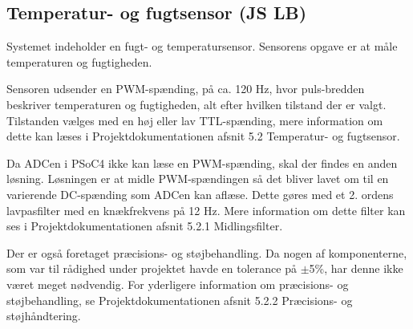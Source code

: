 \subsection{Temperatur- og fugtsensor (JS LB)}


Systemet indeholder en fugt- og temperatursensor. Sensorens opgave er at måle temperaturen og fugtigheden.

Sensoren udsender en PWM-spænding, på ca. 120 Hz, hvor puls-bredden beskriver temperaturen og fugtigheden, alt efter hvilken tilstand der er valgt. Tilstanden vælges med en høj eller lav TTL-spænding, mere information om dette kan læses i Projektdokumentationen afsnit 5.2 Temperatur- og fugtsensor.

Da ADCen i PSoC4 ikke kan læse en PWM-spænding, skal der findes en anden løsning. Løsningen er at midle PWM-spændingen så det bliver lavet om til en varierende DC-spænding som ADCen kan aflæse. Dette gøres med et 2. ordens lavpasfilter med en knækfrekvens på 12 Hz. Mere information om dette filter kan ses i Projektdokumentationen afsnit 5.2.1 Midlingsfilter.
 
Der er også foretaget præcisions- og støjbehandling. Da nogen af komponenterne, som var til rådighed under projektet havde en tolerance på $\pm$5\%, har denne ikke været meget nødvendig. For yderligere information om præcisions- og støjbehandling, se Projektdokumentationen afsnit 5.2.2 Præcisions- og støjhåndtering. 